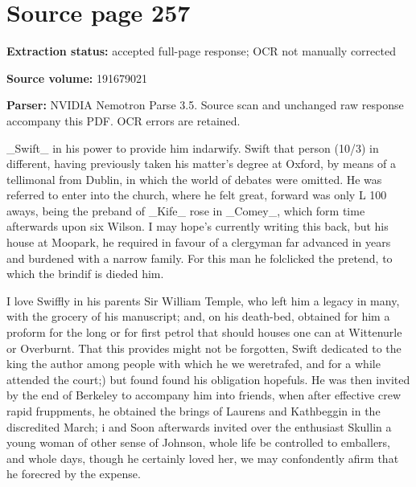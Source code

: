 \clearpage
\section{Source page 257}
\textbf{Extraction status:} accepted full-page response; OCR not manually corrected\par
\textbf{Source volume:} 191679021\par
\textbf{Parser:} NVIDIA Nemotron Parse 3.5. Source scan and unchanged raw response accompany this PDF. OCR errors are retained.\par\medskip
\_Swift\_ in his power to provide him indarwify. Swift that person (10/3) in different, having previously taken his matter’s degree at Oxford, by means of a tellimonal from Dublin, in which the world of debates were omitted. He was referred to enter into the church, where he felt great, forward was only L 100 aways, being the preband of \_Kife\_ rose in \_Comey\_, which form time afterwards upon six Wilson. I may hope’s currently writing this back, but his house at Moopark, he required in favour of a clergyman far advanced in years and burdened with a narrow family. For this man he folclicked the pretend, to which the brindif is dieded him.\par\medskip
I love Swiffly in his parents Sir William Temple, who left him a legacy in many, with the grocery of his manuscript; and, on his death-bed, obtained for him a proform for the long or for first petrol that should houses one can at Wittenurle or Overburnt. That this provides might not be forgotten, Swift dedicated to the king the author among people with which he we weretrafed, and for a while attended the court;) but found found his obligation hopefuls. He was then invited by the end of Berkeley to accompany him into friends, when after effective crew rapid fruppments, he obtained the brings of Laurens and Kathbeggin in the discredited March; i and Soon afterwards invited over the enthusiast Skullin a young woman of other sense of Johnson, whole life be controlled to emballers, and whole days, though he certainly loved her, we may confondently afirm that he forecred by the expense.\par\medskip

